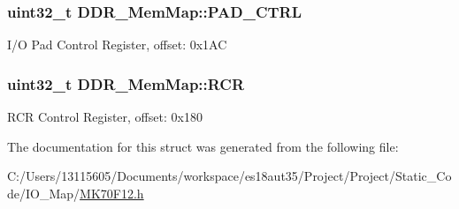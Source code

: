\subsubsection[{P\+A\+D\+\_\+\+C\+T\+R\+L}]{\setlength{\rightskip}{0pt plus 5cm}uint32\+\_\+t D\+D\+R\+\_\+\+Mem\+Map\+::\+P\+A\+D\+\_\+\+C\+T\+R\+L}\label{struct_d_d_r___mem_map_abeb11d4cc28f5bb277d0cd4a46cb2ce1}
I/\+O Pad Control Register, offset\+: 0x1\+A\+C \hypertarget{struct_d_d_r___mem_map_a46f3bdf0cbb782701ad3edd860cfb667}{}
\subsubsection[{R\+C\+R}]{\setlength{\rightskip}{0pt plus 5cm}uint32\+\_\+t D\+D\+R\+\_\+\+Mem\+Map\+::\+R\+C\+R}\label{struct_d_d_r___mem_map_a46f3bdf0cbb782701ad3edd860cfb667}
R\+C\+R Control Register, offset\+: 0x180 

The documentation for this struct was generated from the following file\+:\begin{DoxyCompactItemize}
\item 
C\+:/\+Users/13115605/\+Documents/workspace/es18aut35/\+Project/\+Project/\+Static\+\_\+\+Code/\+I\+O\+\_\+\+Map/\hyperlink{_m_k70_f12_8h}{M\+K70\+F12.\+h}\end{DoxyCompactItemize}
